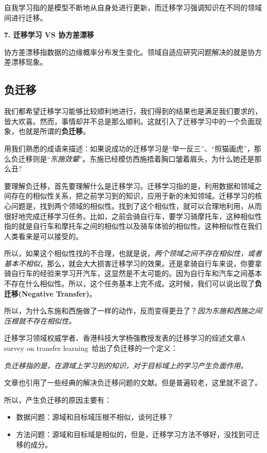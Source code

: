 自我学习指的是模型不断地从自身处进行更新，而迁移学习强调知识在不同的领域间进行迁移。

\textbf{7. 迁移学习 VS 协方差漂移}

协方差漂移指数据的边缘概率分布发生变化。领域自适应研究问题解决的就是协方差漂移现象。

\subsection{负迁移}
我们都希望迁移学习能够比较顺利地进行，我们得到的结果也是满足我们要求的，皆大欢喜。然而，事情却并不总是那么顺利。这就引入了迁移学习中的一个负面现象，也就是所谓的\textbf{负迁移}。

用我们熟悉的成语来描述：如果说成功的迁移学习是“举一反三”、“照猫画虎”，那么负迁移则是“\textit{东施效颦}”。东施已经模仿西施捂着胸口皱着眉头，为什么她还是那么丑?

要理解负迁移，首先要理解什么是迁移学习。迁移学习指的是，利用数据和领域之间存在的相似性关系，把之前学习到的知识，应用于新的未知领域。迁移学习的核心问题是，找到两个领域的相似性。找到了这个相似性，就可以合理地利用，从而很好地完成迁移学习任务。比如，之前会骑自行车，要学习骑摩托车，这种相似性指的就是自行车和摩托车之间的相似性以及骑车体验的相似性。这种相似性在我们人类看来是可以接受的。

所以，如果这个相似性找的不合理，也就是说，\textit{两个领域之间不存在相似性，或者基本不相似}，那么，就会大大损害迁移学习的效果。还是拿骑自行车来说，你要拿骑自行车的经验来学习开汽车，这显然是不太可能的。因为自行车和汽车之间基本不存在什么相似性。所以，这个任务基本上完不成。这时候，我们可以说出现了\textbf{负迁移(Negative Transfer)}。

所以，为什么东施和西施做了一样的动作，反而变得更丑了？\textit{因为东施和西施之间压根就不存在相似性。}

迁移学习领域权威学者、香港科技大学杨强教授发表的迁移学习的综述文章A survey on transfer learning~\cite{pan2010survey}给出了负迁移的一个定义：

\textit{负迁移指的是，在源域上学习到的知识，对于目标域上的学习产生负面作用。}

文章也引用了一些经典的解决负迁移问题的文献。但是普遍较老，这里就不说了。

所以，产生负迁移的原因主要有：

\begin{itemize}
	\item 数据问题：源域和目标域压根不相似，谈何迁移？
	\item 方法问题：源域和目标域是相似的，但是，迁移学习方法不够好，没找到可迁移的成分。
\end{itemize}

